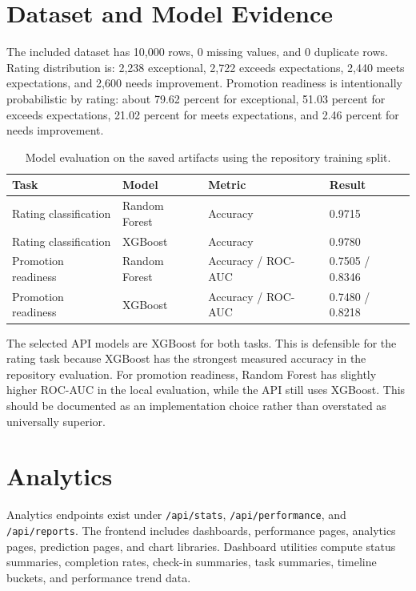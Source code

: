 \section{Dataset and Model Evidence}
The included dataset has 10,000 rows, 0 missing values, and 0 duplicate rows. Rating distribution is: 2,238 exceptional, 2,722 exceeds expectations, 2,440 meets expectations, and 2,600 needs improvement. Promotion readiness is intentionally probabilistic by rating: about 79.62 percent for exceptional, 51.03 percent for exceeds expectations, 21.02 percent for meets expectations, and 2.46 percent for needs improvement.

\begin{table}[H]\centering\small
\caption{Model evaluation on the saved artifacts using the repository training split.}
\label{tab:model-results}
\begin{tabularx}{\textwidth}{p{}p{}p{}Y}
\toprule
Task & Model & Metric & Result\\
\midrule
Rating classification & Random Forest & Accuracy & 0.9715\\
Rating classification & XGBoost & Accuracy & 0.9780\\
Promotion readiness & Random Forest & Accuracy / ROC-AUC & 0.7505 / 0.8346\\
Promotion readiness & XGBoost & Accuracy / ROC-AUC & 0.7480 / 0.8218\\
\bottomrule
\end{tabularx}
\end{table}




The selected API models are XGBoost for both tasks. This is defensible for the rating task because XGBoost has the strongest measured accuracy in the repository evaluation. For promotion readiness, Random Forest has slightly higher ROC-AUC in the local evaluation, while the API still uses XGBoost. This should be documented as an implementation choice rather than overstated as universally superior.

\section{Analytics}
Analytics endpoints exist under \texttt{/api/stats}, \texttt{/api/performance}, and \texttt{/api/reports}. The frontend includes dashboards, performance pages, analytics pages, prediction pages, and chart libraries. Dashboard utilities compute status summaries, completion rates, check-in summaries, task summaries, timeline buckets, and performance trend data.

